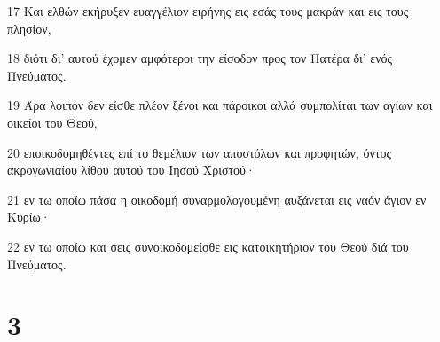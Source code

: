 \par 17 Και ελθών εκήρυξεν ευαγγέλιον ειρήνης εις εσάς τους μακράν και εις τους πλησίον,
\par 18 διότι δι' αυτού έχομεν αμφότεροι την είσοδον προς τον Πατέρα δι' ενός Πνεύματος.
\par 19 Άρα λοιπόν δεν είσθε πλέον ξένοι και πάροικοι αλλά συμπολίται των αγίων και οικείοι του Θεού,
\par 20 εποικοδομηθέντες επί το θεμέλιον των αποστόλων και προφητών, όντος ακρογωνιαίου λίθου αυτού του Ιησού Χριστού·
\par 21 εν τω οποίω πάσα η οικοδομή συναρμολογουμένη αυξάνεται εις ναόν άγιον εν Κυρίω·
\par 22 εν τω οποίω και σεις συνοικοδομείσθε εις κατοικητήριον του Θεού διά του Πνεύματος.

\chapter{3}

